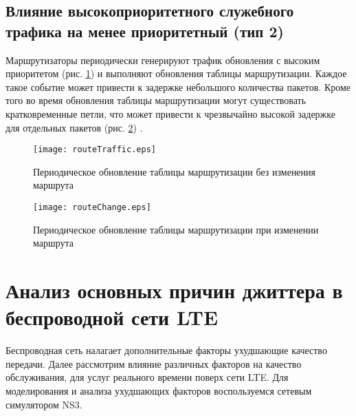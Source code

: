 \subsection{Влияние высокоприоритетного служебного трафика на менее приоритетный (тип 2) } \label{subsect2_1_7}
Маршрутизаторы периодически генерируют трафик обновления с высоким приоритетом (рис. \ref{img:routeTraffic}) \cite{clark} и выполняют обновления таблицы маршрутизации. 
Каждое такое событие может привести к задержке небольшого количества пакетов. 
Кроме того во время обновления таблицы маршрутизации могут существовать кратковременные петли, 
что может привести к чрезвычайно высокой задержке для отдельных пакетов (рис. \ref{img:routeChange}) \cite{clark}.

\begin{figure} [!h]
  \center
\texttt{[image: routeTraffic.eps]}
  \caption{Периодическое обновление таблицы маршрутизации без изменения маршрута}
  \label{img:routeTraffic}
\end{figure}
\begin{figure} [!h]
  \center
\texttt{[image: routeChange.eps]}
  \caption{Периодическое обновление таблицы маршрутизации при изменении маршрута}
  \label{img:routeChange}
\end{figure}

\section{Анализ основных причин джиттера в беспроводной сети LTE} \label{sect2_2}
Беспроводная сеть налагает дополнительные факторы ухудшающие качество передачи. Далее рассмотрим влияние различных факторов на качество обслуживания, для услуг реального времени поверх сети LTE. Для моделирования и анализа ухудшающих факторов воспользуемся сетевым симулятором NS3.

